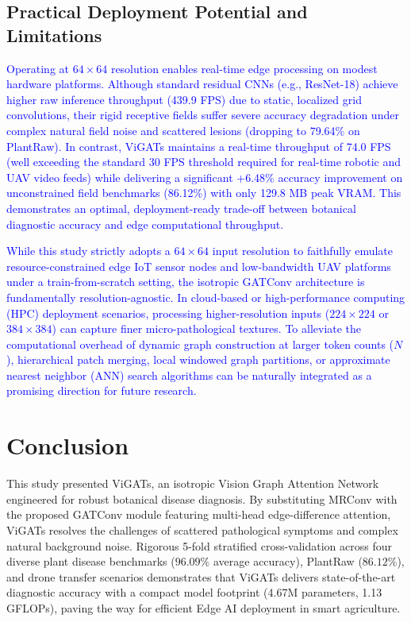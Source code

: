 \documentclass[]{interact}
\theoremstyle{plain}
\theoremstyle{definition}
\theoremstyle{remark}
\begin{document}
{\subsection{Practical Deployment Potential and Limitations}

\textcolor{blue}{Operating at $64\times64$ resolution enables real-time edge processing on modest hardware platforms. Although standard residual CNNs (e.g., ResNet-18) achieve higher raw inference throughput (439.9 FPS) due to static, localized grid convolutions, their rigid receptive fields suffer severe accuracy degradation under complex natural field noise and scattered lesions (dropping to 79.64\% on PlantRaw). In contrast, ViGATs maintains a real-time throughput of 74.0 FPS (well exceeding the standard 30 FPS threshold required for real-time robotic and UAV video feeds) while delivering a significant +6.48\% accuracy improvement on unconstrained field benchmarks (86.12\%) with only 129.8 MB peak VRAM. This demonstrates an optimal, deployment-ready trade-off between botanical diagnostic accuracy and edge computational throughput.}

\textcolor{blue}{While this study strictly adopts a $64\times64$ input resolution to faithfully emulate resource-constrained edge IoT sensor nodes and low-bandwidth UAV platforms under a train-from-scratch setting, the isotropic GATConv architecture is fundamentally resolution-agnostic. In cloud-based or high-performance computing (HPC) deployment scenarios, processing higher-resolution inputs ($224\times224$ or $384\times384$) can capture finer micro-pathological textures. To alleviate the computational overhead of dynamic graph construction at larger token counts ($N$), hierarchical patch merging, local windowed graph partitions, or approximate nearest neighbor (ANN) search algorithms can be naturally integrated as a promising direction for future research.}


}
\section{Conclusion}
{\color{blue}
\label{sec:conclusion}

This study presented ViGATs, an isotropic Vision Graph Attention Network engineered for robust botanical disease diagnosis. By substituting MRConv with the proposed GATConv module featuring multi-head edge-difference attention, ViGATs resolves the challenges of scattered pathological symptoms and complex natural background noise. Rigorous 5-fold stratified cross-validation across four diverse plant disease benchmarks ($96.09\%$ average accuracy), PlantRaw ($86.12\%$), and drone transfer scenarios demonstrates that ViGATs delivers state-of-the-art diagnostic accuracy with a compact model footprint (4.67M parameters, 1.13 GFLOPs), paving the way for efficient Edge AI deployment in smart agriculture.


}
\end{document}
